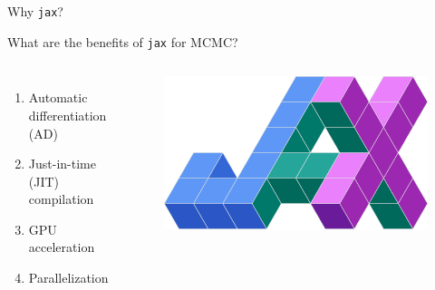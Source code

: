 \documentclass[usenames,dvipsnames,t]{beamer}
\begin{document}
\begin{frame}{Why \texttt{jax}?}

  \def\x{4mm}

  \begin{tcolorbox}[colback=blue!10, boxrule=0pt]
    What are the benefits of \texttt{jax} for MCMC?
  \end{tcolorbox}

\vspace{3mm}

\begin{columns}
  \begin{enumerate}
    \item Automatic differentiation (AD)
    
    \vspace{\x}

    \item Just-in-time (JIT) compilation
    
    \vspace{\x}
    
    \item GPU acceleration
    
    \vspace{\x}
    
    \item Parallelization
    
    
    
    
  \end{enumerate}
  \begin{figure}
    \includegraphics[width=\textwidth]{Figures/jax.png}
  \end{figure}
\end{columns}
  
\end{frame}
\end{document}
